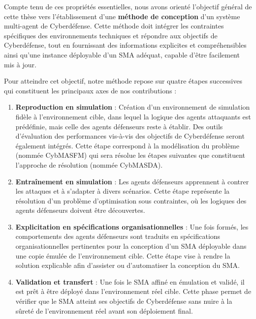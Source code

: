Compte tenu de ces propriétés essentielles, nous avons orienté l’objectif général de cette thèse vers l'établissement d'une \textbf{méthode de conception} d’un système multi-agent de Cyberdéfense. Cette méthode doit intégrer les contraintes spécifiques des environnements techniques et répondre aux objectifs de Cyberdéfense, tout en fournissant des informations explicites et compréhensibles ainsi qu'une instance déployable d'un SMA adéquat, capable d’être facilement mis à jour.

Pour atteindre cet objectif, notre méthode repose sur quatre étapes successives qui constituent les principaux axes de nos contributions :

\begin{enumerate}
    \item \textbf{Reproduction en simulation} : Création d’un environnement de simulation fidèle à l’environnement cible, dans lequel la logique des agents attaquants est prédéfinie, mais celle des agents défenseurs reste à établir. Des outils d’évaluation des performances vis-à-vis des objectifs de Cyberdéfense seront également intégrés. Cette étape correspond à la modélisation du problème (nommée CybMASFM) qui sera résolue les étapes suivantes que constituent l'approche de résolution (nommée CybMASDA).
    
    \item \textbf{Entraînement en simulation} : Les agents défenseurs apprennent à contrer les attaques et à s’adapter à divers scénarios. Cette étape représente la résolution d’un problème d'optimisation sous contraintes, où les logiques des agents défenseurs doivent être découvertes.
    
    \item \textbf{Explicitation en spécifications organisationnelles} : Une fois formés, les comportements des agents défenseurs sont traduits en spécifications organisationnelles pertinentes pour la conception d’un SMA déployable dans une copie émulée de l’environnement cible. Cette étape vise à rendre la solution explicable afin d’assister ou d’automatiser la conception du SMA.
    
    \item \textbf{Validation et transfert} : Une fois le SMA affiné en émulation et validé, il est prêt à être déployé dans l’environnement réel cible. Cette phase permet de vérifier que le SMA atteint ses objectifs de Cyberdéfense sans nuire à la sûreté de l’environnement réel avant son déploiement final.
\end{enumerate}

